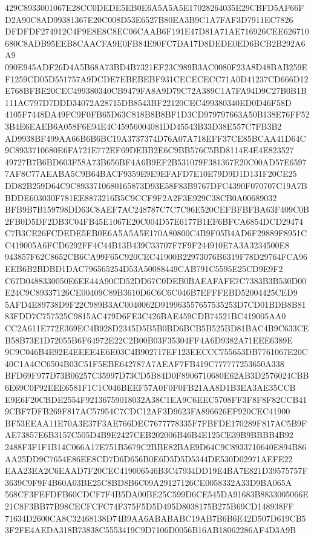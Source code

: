 \documentclass[UTF8,fontset=fandol,zihao=-4,a4paper]{ctexart}
\begin{document}
{{429C8933001067E28CC0DEDE5EB0E6A5A5A5E17028264035E29CBFD5AF66FD2A90C8AD99381367E20C008D53E6527B80EA3B9C1A7FAF3D7911EC7826
DFDFDF274912C4F9E8E8C8EC06CAAB6F191E47D81A71AE716926CEE626710680C8ADB95EEB8CAACFA9E0FB84E90FC7DA17D8DEDE0ED6BCB2B292A6A9
090E945ADF26D4A5B68A73BD4B7321EF23C989B3AC0080F23A8D48BAB259EF1259CD05D551757A9DCDE7EBEBEBF931CECECECC71A0D41237CD666D12
E768BFBE20CEC499380340CB9479FA8A9D79C72A389C1A7FA94D9C27B0B1B111AC797D7DDD34072A28715DB8543BF22120CEC499380340ED0D46F58D
4105F7448DA49FC9F0FB65D63C818B8B8BF1D3CD979797663A50B138E76FF523B4E6EAEB6A058F6E94E4C45956004081DD45543B33D38E557C7FB3B2
AD9938BF499AA66B6B6BC19A3737374D76A07A718EFF37CE85BCAA41D64C9C8933710680E6FA721E772EF69DEBB2E6C9BB576C5BD8114E4E4E823527
49727B7B6BD603F58A73B656BF4A6B9EF2B531079F381367E20C00AD57E65977AF8C77AEABA5C9B64BACF9359E9E9EFAFD7E10E79D9D1D131F20CE25
DD82B259D64C9C8933710680165873D93E58F83B9767DFC4390F070707C19A7BBDDE603030F781EE8873216B5C9CCF9F2A2F3E929C38CB0A00689032
BFB9B7B159798DD63C8AEF7AC248787C7C7C96E520CEFBFBFBA63F409C0B2FB0D5DF2DB3C04FB45E1067E20C004D57E6177B1EF6BFCA6854DCD29474
C7B3CE26FCDEDE5EB0E6A5A5A5E170A80800C4B9F05B4AD6F29889F8951CC419005A6FCD6292FF4C44B13B439C33707F7F9F244910E7A3A3234500E8
943857F62C8652CB6CA99F65C920CEC41900B22973076B6319F78D29764FCA96EEB6B2BDBD1DAC796565254D53A50088449CAB791C5595E25CD9E9F2
C67D0488330050E6EE44A90CD52DD67C0DEB0BAEAFAFE7C7383B3B530D00E24C9C89337126CE00409C89B3610D6C6C6C046B7EFFFEBD52004425CED9
5AFD4E89738D9F22C989B3AC0040062D919963557657535253D7CD01BDB8B8183FDD7C757525C9815AC479D6FE3C426BAE459CDB74521BC419005AA0
CC2A611E772E369EC4B928D2345D5B5B0BD6BCB5B525BD81BAC4B9C633CEB58B73E1D72055B6F64972E22C2B00B03F35304FF4A6D9382A71EEE6389E
9C9C046B4E92E4EEEE4E6E03C4B902717EF123EECCC755653DB7761067E20C40C1A4CC6504B03C51F5EBE642787A7AEAF7FB419C777777253650A338
BFD69F977D73B06257C35997D73CD5B84D0F8906710680E62AB3D2576024CBB6E69C0F92EEE6581F1C1C046BEEF57A0F0F0FB21AA8D1B3EA3AE35CCB
E9E6F20CBDE2554F92136759018032A38C1EA9C6EEC5708FF3F8F8F82CCB419CBF7DFB269F817AC57954C7CDC12AF3D9623FA896626EF920CEC41900
BF53EEAA11E70A3E37F3AE766DEC7677778335F7FBFDE170289F817AC5B9FAE73857E6B3157C505D4B9E2427CEB202006B46B4E125CE39B9BBBB4B92
2488F3F1F1B14C066A17E751B5679C2BBE82BAE9D64C9C8933710640E894B86AA25DD9C7654E86EE8CD7D6D656B0E6D5D5D5344DE530D02971AEFE22
EAA23EA2C6EAAD7F20CEC419006546B3C47934DD19E4BA7E821D39575757F3639C9F9F4B60A03BE25C8BD8B6C09A29127126CE0058332A33D9BA065A
568CF3FEFDFB60CDCF7F4B5DA00BE25C599D6CE545DA91683B8833005066E21C8F3BB77B98CECFCFC74F375F5D5D495D8038175B275B69CD148938FF
71634D2600CA8C32468138D74B9AA6ABABABC19AB7B6B6E42D507D619CB53F2FE4AEDA318B73838C5553419C9D7106D0056B16AB18062286AF4D3A9B
}}
\end{document}
